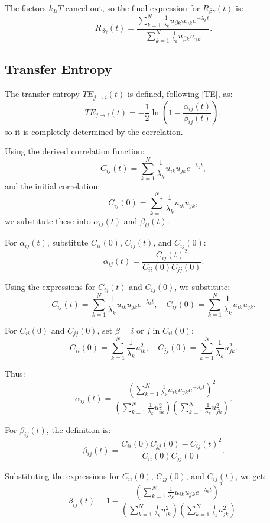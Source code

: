 \documentclass[English, Lau, oneside]{sapthesis}
\begin{document}
The factors \(k_B T\) cancel out, so the final expression for \(R_{\beta\gamma}(t)\) is:
\[
R_{\beta\gamma}(t) = \frac{\sum_{k=1}^N \frac{1}{\lambda_k} u_{\beta k} u_{\gamma k} e^{-\lambda_k t}}{\sum_{k=1}^N \frac{1}{\lambda_k} u_{\beta k} u_{\gamma k}}.
\]


\subsection{Transfer Entropy}

The transfer entropy \(TE_{j \to i}(t)\) is defined, following \eqref{TE}, as:
\[
TE_{j \to i}(t) = -\frac{1}{2} \ln{\left(1 - \frac{\alpha_{ij}(t)}{\beta_{ij}(t)}\right)},
\]
so it is completely determined by the correlation.

Using the derived correlation function:
\[
C_{ij}(t) = \sum_{k=1}^N \frac{1}{\lambda_k} u_{ik} u_{jk} e^{-\lambda_k t},
\]
and the initial correlation:
\[
C_{ij}(0) = \sum_{k=1}^N \frac{1}{\lambda_k} u_{ik} u_{jk},
\]
we substitute these into \(\alpha_{ij}(t)\) and \(\beta_{ij}(t)\).

For \(\alpha_{ij}(t)\), substitute \(C_{ii}(0)\), \(C_{ij}(t)\), and \(C_{ij}(0)\):
\[
\alpha_{ij}(t) = \frac{C_{ij}(t)^2}{C_{ii}(0) C_{jj}(0)}.
\]

Using the expressions for \(C_{ij}(t)\) and \(C_{ij}(0)\), we substitute:
\[
C_{ij}(t) = \sum_{k=1}^N \frac{1}{\lambda_k} u_{ik} u_{jk} e^{-\lambda_k t}, \quad
C_{ij}(0) = \sum_{k=1}^N \frac{1}{\lambda_k} u_{ik} u_{jk}.
\]

For \(C_{ii}(0)\) and \(C_{jj}(0)\), set \(\beta = i\) or \(j\) in \(C_{ii}(0)\):
\[
C_{ii}(0) = \sum_{k=1}^N \frac{1}{\lambda_k} u_{ik}^2, \quad
C_{jj}(0) = \sum_{k=1}^N \frac{1}{\lambda_k} u_{jk}^2.
\]

Thus:
\[
\alpha_{ij}(t) = \frac{\left(\sum_{k=1}^N \frac{1}{\lambda_k} u_{ik} u_{jk} e^{-\lambda_k t}\right)^2}
{\left(\sum_{k=1}^N \frac{1}{\lambda_k} u_{ik}^2\right)\left(\sum_{k=1}^N \frac{1}{\lambda_k} u_{jk}^2\right)}.
\]

For \(\beta_{ij}(t)\), the definition is:
\[
\beta_{ij}(t) = \frac{C_{ii}(0) C_{jj}(0) - C_{ij}(t)^2}{C_{ii}(0) C_{jj}(0)}.
\]

Substituting the expressions for \(C_{ii}(0)\), \(C_{jj}(0)\), and \(C_{ij}(t)\), we get:
\[
\beta_{ij}(t) = 1 - \frac{\left(\sum_{k=1}^N \frac{1}{\lambda_k} u_{ik} u_{jk} e^{-\lambda_k t}\right)^2}
{\left(\sum_{k=1}^N \frac{1}{\lambda_k} u_{ik}^2\right)\left(\sum_{k=1}^N \frac{1}{\lambda_k} u_{jk}^2\right)}.
\]
\end{document}

